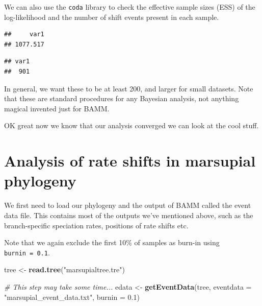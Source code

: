 \documentclass[]{book}
\newenvironment{Shaded}{\begin{snugshade}}{\end{snugshade}}
\newcommand{\KeywordTok}[1]{\textcolor[rgb]{0.13,0.29,0.53}{\textbf{{#1}}}}
\newcommand{\DataTypeTok}[1]{\textcolor[rgb]{0.13,0.29,0.53}{{#1}}}
\newcommand{\FloatTok}[1]{\textcolor[rgb]{0.00,0.00,0.81}{{#1}}}
\newcommand{\StringTok}[1]{\textcolor[rgb]{0.31,0.60,0.02}{{#1}}}
\newcommand{\CommentTok}[1]{\textcolor[rgb]{0.56,0.35,0.01}{\textit{{#1}}}}
\newcommand{\NormalTok}[1]{{#1}}
\theoremstyle{definition}
\theoremstyle{definition}
\theoremstyle{definition}
\theoremstyle{remark}
\begin{document}
We can also use the \texttt{coda} library to check the effective sample
sizes (ESS) of the log-likelihood and the number of shift events present
in each sample.

\begin{Shaded}
\end{Shaded}

\begin{verbatim}
##     var1 
## 1077.517
\end{verbatim}

\begin{Shaded}
\end{Shaded}

\begin{verbatim}
## var1 
##  901
\end{verbatim}

In general, we want these to be at least 200, and larger for small
datasets. Note that these are standard procedures for any Bayesian
analysis, not anything magical invented just for BAMM.

OK great now we know that our analysis converged we can look at the cool
stuff.

\section{Analysis of rate shifts in marsupial
phylogeny}\label{analysis-of-rate-shifts-in-marsupial-phylogeny}

We first need to load our phylogeny and the output of BAMM called the
event data file. This contains most of the outputs we've mentioned
above, such as the branch-specific speciation rates, positions of rate
shifts etc.

Note that we again exclude the first 10\% of samples as burn-in using
\texttt{burnin\ =\ 0.1}.

\begin{Shaded}
\begin{Highlighting}[]
\NormalTok{tree <-}\StringTok{ }\KeywordTok{read.tree}\NormalTok{(}\StringTok{"marsupialtree.tre"}\NormalTok{)}

\CommentTok{# This step may take some time...}
\NormalTok{edata <-}\StringTok{ }\KeywordTok{getEventData}\NormalTok{(tree, }\DataTypeTok{eventdata =} \StringTok{"marsupial_event_data.txt"}\NormalTok{, }\DataTypeTok{burnin =} \FloatTok{0.1}\NormalTok{)}
\end{Highlighting}
\end{Shaded}
\end{document}
